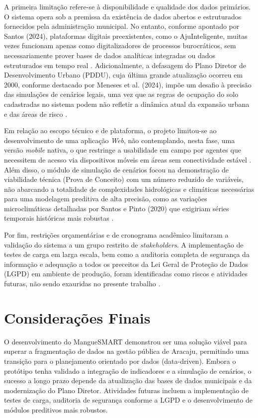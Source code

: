 \documentclass[12pt]{article}
\begin{document}
A primeira limitação refere-se à disponibilidade e qualidade dos dados primários. O sistema opera sob a premissa da existência de dados abertos e estruturados fornecidos pela administração municipal. No entanto, conforme apontado por Santos (2024), plataformas digitais preexistentes, como o AjuInteligente, muitas vezes funcionam apenas como digitalizadores de processos burocráticos, sem necessariamente prover bases de dados analíticas integradas ou dados estruturados em tempo real \cite{Santos2024}. Adicionalmente, a defasagem do Plano Diretor de Desenvolvimento Urbano (PDDU), cuja última grande atualização ocorreu em 2000, conforme destacado por Meneses et al. (2024), impõe um desafio à precisão das simulações de cenários legais, uma vez que as regras de ocupação do solo cadastradas no sistema podem não refletir a dinâmica atual da expansão urbana e das áreas de risco \cite{Meneses2024}.

Em relação ao escopo técnico e de plataforma, o projeto limitou-se ao desenvolvimento de uma aplicação \textit{Web}, não contemplando, nesta fase, uma versão \textit{mobile} nativa, o que restringe a usabilidade em campo por agentes que necessitem de acesso via dispositivos móveis em áreas sem conectividade estável \cite{SAD2025}. Além disso, o módulo de simulação de cenários focou na demonstração de viabilidade técnica (Prova de Conceito) com um número reduzido de variáveis, não abarcando a totalidade de complexidades hidrológicas e climáticas necessárias para uma modelagem preditiva de alta precisão, como as variações microclimáticas detalhadas por Santos e Pinto (2020) que exigiriam séries temporais históricas mais robustas \cite{SantosPinto2020}. 

Por fim, restrições orçamentárias e de cronograma acadêmico limitaram a validação do sistema a um grupo restrito de \textit{stakeholders}. A implementação de testes de carga em larga escala, bem como a auditoria completa de segurança da informação e adequação a todos os preceitos da Lei Geral de Proteção de Dados (LGPD) em ambiente de produção, foram identificadas como riscos e atividades futuras, não sendo exauridas no presente trabalho \cite{SAD2025}.


\section{Considerações Finais} \label{sec:consideracoes}
O desenvolvimento do MangueSMART demonstrou ser uma solução viável para superar a fragmentação de dados na gestão pública de Aracaju, permitindo uma transição para o planejamento orientado por dados (data-driven). Embora o protótipo tenha validado a integração de indicadores e a simulação de cenários, o sucesso a longo prazo depende da atualização das bases de dados municipais e da modernização do Plano Diretor. Atividades futuras incluem a implementação de testes de carga, auditoria de segurança conforme a LGPD e o desenvolvimento de módulos preditivos mais robustos.
\end{document}
